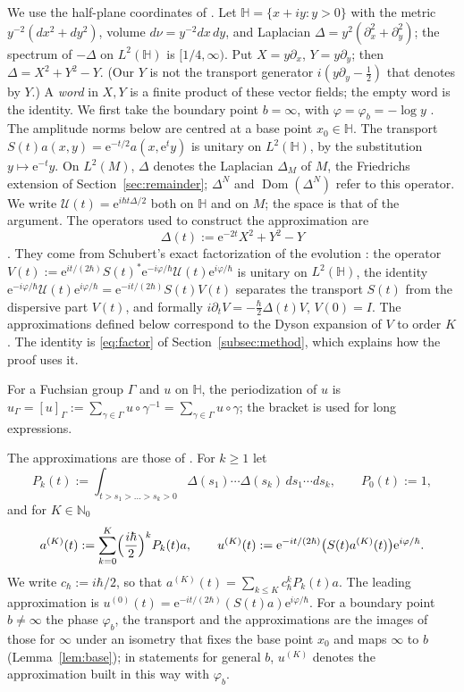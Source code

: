 \documentclass[twoside,10pt]{article}
\numberwithin{equation}{section}
\theoremstyle{slbody}
\theoremstyle{remark}
\newcommand{\Hb}{\mathbb{H}}
\newcommand{\ue}{\mathrm{e}}
\newcommand{\cU}{\mathcal{U}}
\begin{document}
We use the half-plane coordinates of \cite[Section~2]{S}. Let $\Hb=\{x+iy:y>0\}$ with the metric
$y^{-2}(dx^2+dy^2)$, volume $d\nu=y^{-2}dx\,dy$, and Laplacian $\Delta=y^2(\partial_x^2+\partial_y^2)$; the
spectrum of $-\Delta$ on $L^2(\Hb)$ is $[1/4,\infty)$.
Put $X=y\partial_x$, $Y=y\partial_y$; then $\Delta=X^2+Y^2-Y$. (Our $Y$ is not the transport generator
$i(y\partial_y-\tfrac12)$ that \cite{S} denotes by $Y$.) A \emph{word} in $X,Y$ is a finite product of these vector fields; the empty
word is the identity.
We first take the boundary point $b=\infty$, with $\varphi=\varphi_b=-\log y$ \cite[(2.1)]{S}. The amplitude norms below are
centred at a base point $x_0\in\Hb$.
The transport $S(t)a(x,y)=\ue^{-t/2}a(x,\ue^t y)$ is unitary on $L^2(\Hb)$, by the substitution $y\mapsto\ue^{-t}y$.
On $L^2(M)$, $\Delta$ denotes the Laplacian $\Delta_M$ of $M$, the Friedrichs extension of Section~\ref{sec:remainder};
$\Delta^N$ and $\operatorname{Dom}(\Delta^N)$ refer to this operator.
We write $\cU(t)=\ue^{i\hbar t\Delta/2}$ both on $\Hb$ and on $M$; the space is that of the argument.
The operators used to construct the approximation are
\[
\Delta(t):=\ue^{-2t}X^2+Y^2-Y
\]
\cite[(2.9)]{S}. They come from Schubert's exact factorization of the evolution \cite[Proposition~2.2]{S}: the operator
$V(t):=\ue^{it/(2\hbar)}S(t)^*\ue^{-i\varphi/\hbar}\cU(t)\ue^{i\varphi/\hbar}$ is unitary on $L^2(\Hb)$, the identity
$\ue^{-i\varphi/\hbar}\cU(t)\ue^{i\varphi/\hbar}=\ue^{-it/(2\hbar)}S(t)V(t)$ separates the transport $S(t)$ from the dispersive
part $V(t)$, and formally $i\partial_tV=-\tfrac\hbar2\Delta(t)V$, $V(0)=I$. The approximations defined below correspond to the
Dyson expansion of $V$ to order $K$. The identity is \eqref{eq:factor} of Section~\ref{subsec:method}, which explains how the
proof uses it.

For a Fuchsian group $\Gamma$ and $u$ on $\Hb$, the periodization of $u$ is
$u_\Gamma=[u]_\Gamma:=\sum_{\gamma\in\Gamma}u\circ\gamma^{-1}=\sum_{\gamma\in\Gamma}u\circ\gamma$; the bracket is used for
long expressions.

The approximations are those of \cite[(1.20), (1.27)--(1.29)]{S}. For $k\ge1$ let
\[
P_k(t):=\int_{t>s_1>\dots>s_k>0}\Delta(s_1)\cdots\Delta(s_k)\,ds_1\cdots ds_k,\qquad P_0(t):=1,
\]
and for $K\in\mathbb N_0$
\[
a^{(K)}(t):=\sum_{k=0}^{K}\Bigl(\frac{i\hbar}2\Bigr)^{k}P_k(t)a,\qquad
u^{(K)}(t):=\ue^{-it/(2\hbar)}\bigl(S(t)a^{(K)}(t)\bigr)\ue^{i\varphi/\hbar}.
\]
We write $c_\hbar:=i\hbar/2$, so that $a^{(K)}(t)=\sum_{k\le K}c_\hbar^kP_k(t)a$. The leading approximation is
$u^{(0)}(t)=\ue^{-it/(2\hbar)}(S(t)a)\ue^{i\varphi/\hbar}$. For a boundary point $b\ne\infty$ the
phase $\varphi_b$, the transport and the approximations are the images of those for $\infty$ under an isometry that fixes the
base point $x_0$ and maps $\infty$ to $b$ (Lemma~\ref{lem:base}); in statements for general $b$, $u^{(K)}$
denotes the approximation built in this way with $\varphi_b$.
\end{document}
